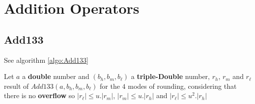 \section{Addition Operators}
\subsection{Add133}
See algorithm \ref{algo:Add133}
\begin{lem}[Add133] Let $a$ a \textbf{double} number and $(b_h, b_m, b_{\ell})$ a   \textbf{triple-Double} number, $r_h$, $r_m$ and  $r_{\ell}$ result of $Add133(a,b_h,b_m,b_{\ell})$ for the $4$ modes of rounding, considering that there is no \textbf{overflow} so $ \lvert r_{\ell} \rvert \le u. \lvert r_m \rvert$, $\lvert r_m \rvert  \le u.\lvert  r_h \rvert$ and $\lvert r_{\ell} \rvert  \le u^2.\lvert  r_h \rvert$
\end{lem}

